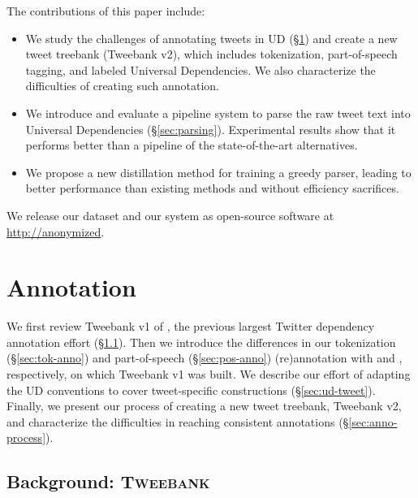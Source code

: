 \documentclass[11pt,a4paper]{article}
\newcommand{\yicomment}[1]{\textcolor{gray}{[#1 ---\textsc{yi}]}}
\begin{document}
The contributions of this paper include:
\begin{itemize}
\item We study the challenges of annotating tweets in UD (\S\ref{sec:anno})
and create a new tweet treebank ({\sc Tweebank v2}), which includes 
tokenization, part-of-speech tagging, and labeled Universal Dependencies.
We also characterize the difficulties of creating such annotation.

\item We introduce and evaluate a pipeline system to parse the raw tweet text into
Universal Dependencies (\S\ref{sec:parsing}).  Experimental results show
that it performs better than a pipeline of the state-of-the-art alternatives.

\item We propose a new distillation
method for training a greedy parser, leading to better performance
than existing methods and without efficiency sacrifices.
\end{itemize}

We release our dataset and our system as open-source software at
\url{http://anonymized}. 


\section{Annotation}\label{sec:anno}

We first review {\sc Tweebank v1} of \citet{kong-EtAl:2014:EMNLP2014},
the previous largest Twitter dependency annotation effort 
(\S\ref{sec:tweebank}).
Then we introduce the differences in our tokenization
(\S\ref{sec:tok-anno}) and part-of-speech (\S\ref{sec:pos-anno}) (re)annotation with \citet{ICWSM101540} and 
\citet{gimpel-EtAl:2011:ACL-HLT2011}, respectively, on which {\sc Tweebank v1} was built. 
We describe our effort of adapting the
UD conventions to cover tweet-specific constructions (\S\ref{sec:ud-tweet}). 
Finally, we present our process of creating a new tweet treebank, {\sc
  Tweebank v2}, and characterize
the difficulties in reaching consistent annotations (\S\ref{sec:anno-process}).

\subsection{Background: \textsc{Tweebank}}\label{sec:tweebank}
\end{document}
